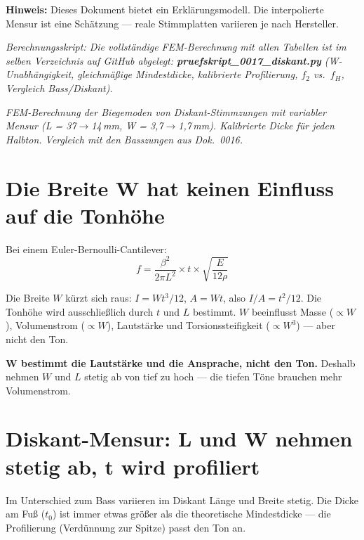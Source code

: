 \documentclass[11pt,a4paper]{article}
\begin{document}
\hbmaketitle
\begin{tcolorbox}[colframe=red!60!black, colback=red!5!white]
\textbf{Hinweis:} Dieses Dokument bietet ein Erklärungsmodell.
Die interpolierte Mensur ist eine Schätzung --- reale Stimmplatten
variieren je nach Hersteller.
\end{tcolorbox}

\noindent\textit{\small Berechnungsskript: Die vollständige FEM-Berechnung mit allen Tabellen
ist im selben Verzeichnis auf GitHub abgelegt:
\textbf{pruefskript\_0017\_diskant.py} (W-Unabhängigkeit, gleichmäßige Mindestdicke,
kalibrierte Profilierung, $f_2$ vs.\ $f_H$, Vergleich Bass/Diskant).}

\noindent\textit{FEM-Berechnung der Biegemoden von Diskant-Stimmzungen mit variabler
Mensur (L = 37$\to$14\,mm, W = 3,7$\to$1,7\,mm). Kalibrierte Dicke für jeden
Halbton. Vergleich mit den Basszungen aus Dok.~0016.}

\section{Die Breite W hat keinen Einfluss auf die Tonhöhe}

Bei einem Euler-Bernoulli-Cantilever:
\begin{equation}
f = \frac{\beta^2}{2\pi L^2} \times t \times \sqrt{\frac{E}{12\rho}}
\end{equation}

Die Breite $W$ kürzt sich raus: $I = Wt^3/12$, $A = Wt$, also $I/A = t^2/12$.
Die Tonhöhe wird ausschließlich durch $t$ und $L$ bestimmt.
$W$ beeinflusst Masse ($\propto W$), Volumenstrom ($\propto W$),
Lautstärke und Torsionssteifigkeit ($\propto W^3$) --- aber nicht den Ton.

\begin{tcolorbox}[colframe=keygreen, colback=green!5!white]
\textbf{W bestimmt die Lautstärke und die Ansprache, nicht den Ton.}
Deshalb nehmen $W$ und $L$ stetig ab von tief zu hoch ---
die tiefen Töne brauchen mehr Volumenstrom.
\end{tcolorbox}

\section{Diskant-Mensur: L und W nehmen stetig ab, t wird profiliert}

Im Unterschied zum Bass variieren im Diskant Länge und Breite stetig.
Die Dicke am Fuß ($t_0$) ist immer etwas größer als die theoretische
Mindestdicke --- die Profilierung (Verdünnung zur Spitze) passt den Ton an.
\end{document}
